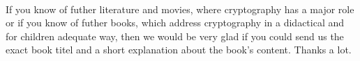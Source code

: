 \mbox{}\\

If you know of futher literature and movies, where cryptography has a major
role or if you know of futher books, which address cryptography in a
didactical and for children adequate way, then we would be very glad if
you could send us the exact book titel and a short explanation
about the book's content. Thanks a lot.


\clearpage
\listoffigures
{}


\clearpage

\listoftables
{}



